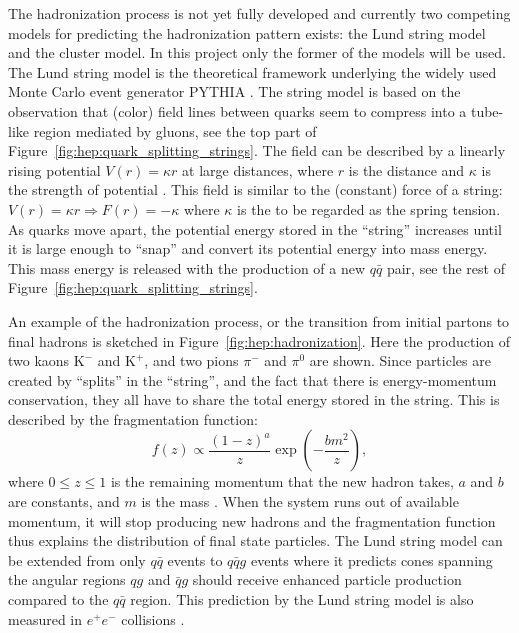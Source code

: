 \documentclass[a4paper, twoside, nobib]{tufte-book}
\newcommand{\q}[1]{``#1''}
\newcommand{\autocite}[1]{\citep{#1}}
\begin{document}
The hadronization process is not yet fully developed and currently two competing models for predicting the hadronization pattern exists: the Lund string model and the cluster model. In this project only the former of the models will be used. The Lund string model \autocite{anderssonPartonFragmentationString1983} is the theoretical framework underlying the widely used Monte Carlo event generator PYTHIA \autocite{sjostrandIntroductionPYTHIA2015}. The string model is based on the observation that (color) field lines between quarks seem to compress into a tube-like region mediated by gluons, see the top part of Figure~\ref{fig:hep:quark_splitting_strings}. The field can be described by a linearly rising potential $V(r)=\kappa r$ at large distances, where $r$ is the distance and $\kappa$ is the strength of potential \autocite{buckleyGeneralpurposeEventGenerators2011}. This field is similar to the (constant) force of a string: $V(r)=\kappa r \Rightarrow F(r) = -\kappa$ where $\kappa$ is the to be regarded as the spring tension. As quarks move apart, the potential energy stored in the \q{string} increases until it is large enough to \q{snap} and convert its potential energy into mass energy. This mass energy is released with the production of a new $q\bar{q}$ pair, see the rest of Figure~\ref{fig:hep:quark_splitting_strings}. 

An example of the hadronization process, or the transition from initial partons to final hadrons is sketched in Figure~\ref{fig:hep:hadronization}. Here the production of two kaons $\mathrm{K}^-$ and $\mathrm{K}^+$, and two pions $\pi^-$ and $\pi^0$ are shown. Since particles are created by \q{splits} in the \q{string}, and the fact that there is energy-momentum conservation, they all have to share the total energy stored in the string. This is described by the fragmentation function:
\begin{equation}
  f(z) \propto \frac{(1-z)^a}{z} \exp \left(- \frac{b m^2}{z} \right),
\end{equation}
where $0 \leq z \leq 1$ is the remaining momentum that the new hadron takes, $a$ and $b$ are constants, and $m$ is the mass \autocite{bierlichRopeHadronizationGeometry2016}. When the system runs out of available momentum, it will stop producing new hadrons and the fragmentation function thus explains the distribution of final state particles. The Lund string model can be extended from only $q\bar{q}$ events to $q\bar{q}g$ events where it predicts cones spanning the angular regions $qg$ and $\bar{q}g$ should receive enhanced particle production compared to the $q\bar{q}$ region. This prediction by the Lund string model is also measured in $e^+e^-$ collisions \autocite{buckleyGeneralpurposeEventGenerators2011}.
\end{document}
